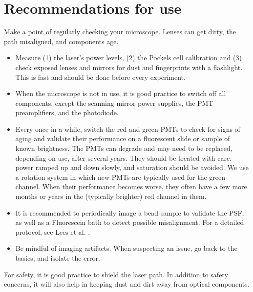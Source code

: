 \documentclass[10pt,letterpaper]{article}
\begin{document}
\section{Recommendations for use}
Make a point of regularly checking your microscope. Lenses can get dirty, the path misaligned, and components age.
%
\begin{itemize}
    \item Measure (1) the laser's power levels, (2) the Pockels cell calibration and (3) check exposed lenses and mirrors for dust and fingerprints with a flashlight. This is fast and should be done before every experiment.
    \item When the microscope is not in use, it is good practice to switch off all components, except the scanning mirror power supplies, the PMT preamplifiers, and the photodiode.
    \item Every once in a while, switch the red and green PMTs to check for signs of aging and validate their performance on a fluorescent slide or sample of known brightness. The PMTs can degrade and may need to be replaced, depending on use, after several years. They should be treated with care: power ramped up and down slowly, and saturation should be avoided. We use a rotation system in which new PMTs are typically used for the green channel. When their performance becomes worse, they often have a few more months or years in the (typically brighter) red channel in them.
    \item It is recommended to periodically image a bead sample to validate the PSF, as well as a Fluorescein bath to detect possible misalignment. For a detailed protocol, see Lees et al. \cite{Lees2024}.
    \item Be mindful of imaging artifacts. When suspecting an issue, go back to the basics, and isolate the error.
\end{itemize}
%
 For safety, it is good practice to shield the laser path. In addition to safety concerns, it will also help in keeping dust and dirt away from optical components.
\end{document}
